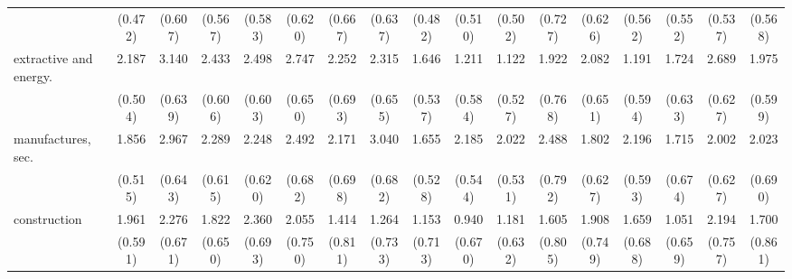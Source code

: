 {\begin{tabular}{l*{16}{c}}
                    &     (0.472)         &     (0.607)         &     (0.567)         &     (0.583)         &     (0.620)         &     (0.667)         &     (0.637)         &     (0.482)         &     (0.510)         &     (0.502)         &     (0.727)         &     (0.626)         &     (0.562)         &     (0.552)         &     (0.537)         &     (0.568)         \\
[1em]
extractive and energy.&       2.187\sym{***}&       3.140\sym{***}&       2.433\sym{***}&       2.498\sym{***}&       2.747\sym{***}&       2.252\sym{**} &       2.315\sym{***}&       1.646\sym{**} &       1.211\sym{*}  &       1.122\sym{*}  &       1.922\sym{*}  &       2.082\sym{**} &       1.191\sym{*}  &       1.724\sym{**} &       2.689\sym{***}&       1.975\sym{***}\\
                    &     (0.504)         &     (0.639)         &     (0.606)         &     (0.603)         &     (0.650)         &     (0.693)         &     (0.655)         &     (0.537)         &     (0.584)         &     (0.527)         &     (0.768)         &     (0.651)         &     (0.594)         &     (0.633)         &     (0.627)         &     (0.599)         \\
[1em]
manufactures, sec.  &       1.856\sym{***}&       2.967\sym{***}&       2.289\sym{***}&       2.248\sym{***}&       2.492\sym{***}&       2.171\sym{**} &       3.040\sym{***}&       1.655\sym{**} &       2.185\sym{***}&       2.022\sym{***}&       2.488\sym{**} &       1.802\sym{**} &       2.196\sym{***}&       1.715\sym{*}  &       2.002\sym{**} &       2.023\sym{**} \\
                    &     (0.515)         &     (0.643)         &     (0.615)         &     (0.620)         &     (0.682)         &     (0.698)         &     (0.682)         &     (0.528)         &     (0.544)         &     (0.531)         &     (0.792)         &     (0.627)         &     (0.593)         &     (0.674)         &     (0.627)         &     (0.690)         \\
[1em]
construction        &       1.961\sym{***}&       2.276\sym{***}&       1.822\sym{**} &       2.360\sym{***}&       2.055\sym{**} &       1.414         &       1.264         &       1.153         &       0.940         &       1.181         &       1.605\sym{*}  &       1.908\sym{*}  &       1.659\sym{*}  &       1.051         &       2.194\sym{**} &       1.700\sym{*}  \\
                    &     (0.591)         &     (0.671)         &     (0.650)         &     (0.693)         &     (0.750)         &     (0.811)         &     (0.733)         &     (0.713)         &     (0.670)         &     (0.632)         &     (0.805)         &     (0.749)         &     (0.688)         &     (0.659)         &     (0.757)         &     (0.861)         \\

\end{tabular}}
